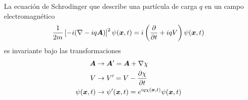 \begin{teor}
	La ecuación de Schrodinger que describe una partícula de carga $q$ en un campo electromagnético
	\begin{equation}
  \frac{1}{2m}\left[-i(\nabla-iq\vb*{A})\right]^2\psi(\vb*{x},t) =
  i\left(\pdv{t}+iqV\right)\psi(\vb*{x},t) 
\end{equation}
es invariante bajo las transformaciones
	\begin{equation}
	\begin{split}
  \vb*{A}&\to \vb*{A}'=\vb*{A}+\nabla\chi \\
  V&\to V'=V-\pdv{\chi}{t}\\
  \psi(\vb*{x},t) &\to \psi'(\vb*{x},t) =e^{iq\chi(\vb*{x},t) }\psi(\vb*{x},t) 
  \end{split} 
\end{equation}
\end{teor}

